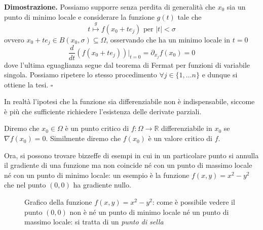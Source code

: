 \noindent \textbf{Dimostrazione. }
Possiamo supporre senza perdita di generalità che $x_0$ sia un punto di minimo locale e considerare la funzione $g(t)$ tale che
$$
t \stackrel{g}{\mapsto} f(x_0 + te_j) \text{ per } |t| < \sigma
$$
ovvero $x_0 + te_j \in B(x_0, \sigma) \subseteq \Omega$, osservando che ha un minimo locale in $t=0$
$$
\frac{d}{dt} \left( f(x_0 + te_j) \right){\big|_{t=0}} = \partial_{x_j} f(x_0) = 0
$$
dove l'ultima eguaglianza segue dal teorema di Fermat per funzioni di variabile singola. Possiamo ripetere lo stesso procedimento $\forall j \in \{1, \ldots n \}$ e dunque si ottiene la tesi.
\hfill $\square$

\begin{remark}
In realtà l'ipotesi che la funzione sia differenziabile non è indispensabile, siccome è più che sufficiente richiedere l'esistenza delle derivate parziali.
\end{remark}

\vspace{0.5cm}
\begin{definition}[\textcolor{blue}{punto critico}]
Diremo che $x_0 \in \Omega$ è un punto critico di $f: \Omega \to \mathbb{R}$ differenziabile in $x_0$ se $\nabla{f(x_0)} = 0$. Similmente diremo che $f(x_0)$ è un valore critico di $f$.
\end{definition}

Ora, si possono trovare bizzeffe di esempi in cui in un particolare punto si annulla il gradiente di una funzione ma non coincide né con un punto di massimo locale né con un punto di minimo locale: un esempio è la funzione $f(x, y) = x^2 - y^2$ che nel punto $(0, 0)$ ha gradiente nullo. \\

\begin{figure}[htbp]
\centering
{}
\label{fig:punto_sella}
\caption{Grafico della funzione $f(x, y) = x^2 - y^2$: come è possibile vedere il punto $(0, 0)$ non è né un punto di minimo locale né un punto di massimo locale: si tratta di un \emph{punto di sella}}
\end{figure}

